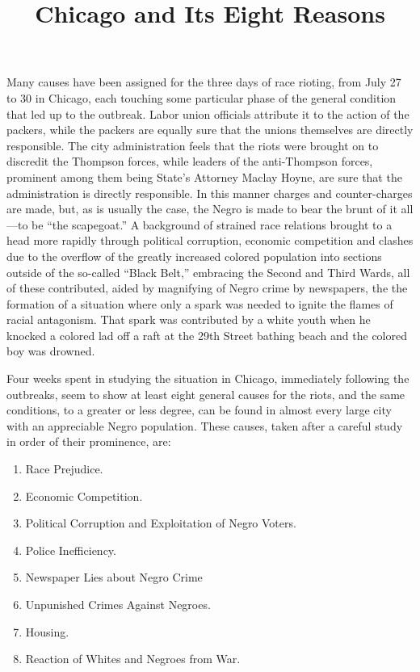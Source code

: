 \documentclass[11pt,article,oneside]{memoir}
\title{\bigskip \bigskip Chicago and Its Eight Reasons }
\author{\Large Walter
White\vspace{0.05in} \and \Large \vspace{0.05in} \and }
\date{}
\begin{document}
  
\pagestyle{kjh}

\published{}

\maketitle




\bigskip 

Many causes have been assigned for the three days of race rioting, from
July 27 to 30 in Chicago, each touching some particular phase of the
general condition that led up to the outbreak. Labor union officials
attribute it to the action of the packers, while the packers are equally
sure that the unions themselves are directly responsible. The city
administration feels that the riots were brought on to discredit the
Thompson forces, while leaders of the anti-Thompson forces, prominent
among them being State's Attorney Maclay Hoyne, are sure that the
administration is directly responsible. In this manner charges and
counter-charges are made, but, as is usually the case, the Negro is made
to bear the brunt of it all---to be ``the scapegoat.'' A background of
strained race relations brought to a head more rapidly through political
corruption, economic competition and clashes due to the overflow of the
greatly increased colored population into sections outside of the
so-called ``Black Belt,'' embracing the Second and Third Wards, all of
these contributed, aided by magnifying of Negro crime by newspapers, the
the formation of a situation where only a spark was needed to ignite the
flames of racial antagonism. That spark was contributed by a white youth
when he knocked a colored lad off a raft at the 29th Street bathing
beach and the colored boy was drowned.

Four weeks spent in studying the situation in Chicago, immediately
following the outbreaks, seem to show at least eight general causes for
the riots, and the same conditions, to a greater or less degree, can be
found in almost every large city with an appreciable Negro population.
These causes, taken after a careful study in order of their prominence,
are:

\begin{enumerate}
\def\labelenumi{\arabic{enumi}.}
\tightlist
\item
  Race Prejudice.
\item
  Economic Competition.
\item
  Political Corruption and Exploitation of Negro Voters.
\item
  Police Inefficiency.
\item
  Newspaper Lies about Negro Crime
\item
  Unpunished Crimes Against Negroes.
\item
  Housing.
\item
  Reaction of Whites and Negroes from War.
\end{enumerate}
\end{document}
